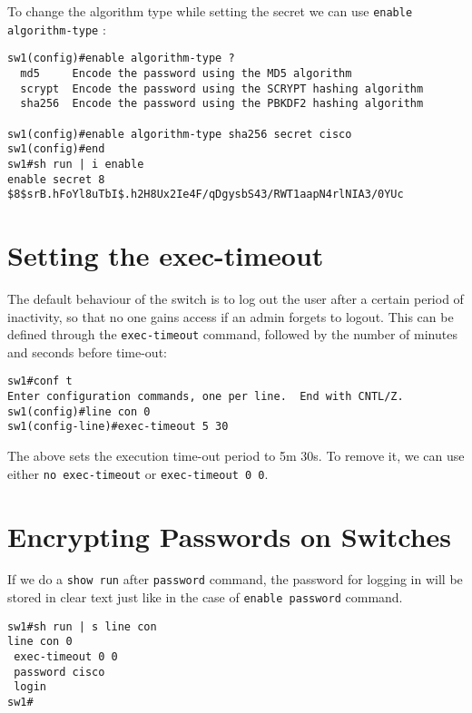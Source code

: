 \noindent
To change the algorithm type while setting the secret we can use \verb|enable algorithm-type| : 

\vspace{-15pt}
\begin{verbatim}
sw1(config)#enable algorithm-type ?
  md5     Encode the password using the MD5 algorithm
  scrypt  Encode the password using the SCRYPT hashing algorithm
  sha256  Encode the password using the PBKDF2 hashing algorithm

sw1(config)#enable algorithm-type sha256 secret cisco
sw1(config)#end
sw1#sh run | i enable
enable secret 8 $8$srB.hFoYl8uTbI$.h2H8Ux2Ie4F/qDgysbS43/RWT1aapN4rlNIA3/0YUc
\end{verbatim}
\vspace{-10pt}

\section{Setting the exec-timeout}
The default behaviour of the switch is to log out the user after a certain period of inactivity, so that no one gains access if an admin forgets to logout. This can be defined through the \verb|exec-timeout| command, followed by the number of minutes and seconds before time-out:

\vspace{-15pt}
\begin{verbatim}
sw1#conf t
Enter configuration commands, one per line.  End with CNTL/Z.
sw1(config)#line con 0
sw1(config-line)#exec-timeout 5 30

\end{verbatim}
\vspace{-10pt}

\noindent
The above sets the execution time-out period to 5m 30s. To remove it, we can use either \verb|no exec-timeout| or \verb|exec-timeout 0 0|.

\section{Encrypting Passwords on Switches}
If we do a \verb|show run| after \verb|password| command, the password for logging in will be stored in clear text just like in the case of \verb|enable password| command. 

\vspace{-15pt}
\begin{verbatim}
sw1#sh run | s line con
line con 0
 exec-timeout 0 0
 password cisco
 login
sw1#
\end{verbatim}
\vspace{-10pt}

